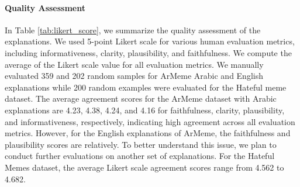 \paragraph{Quality Assessment}
In Table \ref{tab:likert_score}, we summarize the quality assessment of the explanations. We used 5-point Likert scale for various human evaluation metrics, including informativeness, clarity, plausibility, and faithfulness. We compute the average of the Likert scale value for all evaluation metrics. We manually evaluated 359 and 202 random samples for ArMeme Arabic and English explanations while 200 random examples were evaluated for the Hateful meme dataset. The average agreement scores for the ArMeme dataset with Arabic explanations are 4.23, 4.38, 4.24, and 4.16 for faithfulness, clarity, plausibility, and informativeness, respectively, indicating high agreement across all evaluation metrics. However, for the English explanations of ArMeme, the faithfulness and plausibility scores are relatively. To better understand this issue, we plan to conduct further evaluations on another set of explanations.
For the Hateful Memes dataset, the average Likert scale agreement scores range from 4.562 to 4.682.

\begin{table}[h]
\centering
\setlength{\tabcolsep}{1pt} 
\vspace{-0.3cm}
\caption{Average Likert scale value for each human evaluation metric across different sets of explanations.}
\label{tab:likert_score}
\vspace{-0.4cm}
\end{table}

